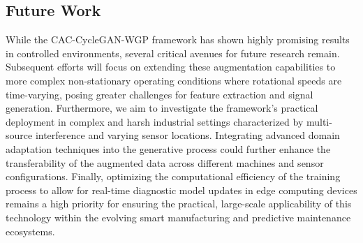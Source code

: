\subsection{Future Work}
While the CAC-CycleGAN-WGP framework has shown highly promising results in controlled environments, several critical avenues for future research remain. Subsequent efforts will focus on extending these augmentation capabilities to more complex non-stationary operating conditions where rotational speeds are time-varying, posing greater challenges for feature extraction and signal generation. Furthermore, we aim to investigate the framework's practical deployment in complex and harsh industrial settings characterized by multi-source interference and varying sensor locations. Integrating advanced domain adaptation techniques into the generative process could further enhance the transferability of the augmented data across different machines and sensor configurations. Finally, optimizing the computational efficiency of the training process to allow for real-time diagnostic model updates in edge computing devices remains a high priority for ensuring the practical, large-scale applicability of this technology within the evolving smart manufacturing and predictive maintenance ecosystems.
